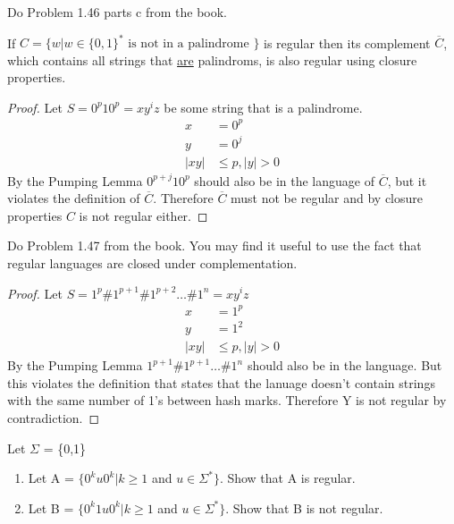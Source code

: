 \begin{problem}{4}
  Do Problem 1.46 parts c from the book.
  \begin{solution}
    If $C = \{ w|w \in \{ 0,1 \}^* \text{ is not in a palindrome }\}$ is regular then its complement $\overline{C}$, which contains
    all strings that \underline{are} palindroms, is also regular using closure properties.
    \begin{proof}
      Let $S = 0^p10^p = xy^iz$ be some string that is a palindrome. \\
      \begin{align*}
        x &= 0^p \\
        y &= 0^j \\
        |xy| &\le p, |y| > 0
      \end{align*}
      By the Pumping Lemma $0^{p+j}10^p$ should also be in the language of $\overline{C}$, but it violates the definition of
      $\overline{C}$. Therefore $\overline{C}$ must not be regular and by closure properties $C$ is not regular either.
    \end{proof}
  \end{solution}
\end{problem}

\begin{problem}{5}
  Do Problem 1.47 from the book. You may find it useful to use the fact that regular languages are closed under
  complementation.
  \begin{solution}
    \begin{proof}
      Let $S = 1^p\#1^{p+1}\#1^{p+2}\ldots\#1^{n} = xy^iz$
      \begin{align*}
        x &= 1^p \\
        y &= 1^2 \\
        |xy| &\le p, |y| > 0
      \end{align*}
      By the Pumping Lemma $1^{p+1}\#1^{p+1}\ldots\#1^{n}$ should also be in the language. But this violates the definition
      that states that the lanuage doesn't contain strings with the same number of 1's between hash marks. Therefore Y
      is not regular by contradiction.
    \end{proof}
  \end{solution}
\end{problem} \newpage

\begin{problem}{6}
  Let $\Sigma$ = \{0,1\}
  \begin{enumerate}
    \item Let A = $\{ 0^ku0^k | k \ge 1$ and $u \in \Sigma^* \}$. Show that A is regular. \\
    \item Let B = $\{ 0^k1u0^k | k \ge 1$ and $u \in \Sigma^* \}$. Show that B is not regular.
  \end{enumerate}
\end{problem}

